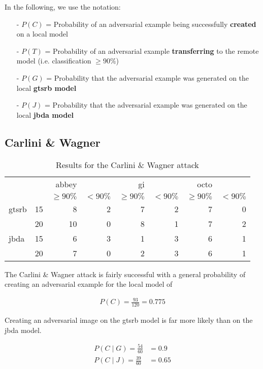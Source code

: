 In the following, we use the notation:

\begin{itemize}
\item[-] $P(C)$ = Probability of an adversarial example being successfully \textbf{created} on a local model
\item[-] $P(T)$ = Probability of an adversarial example \textbf{transferring} to the remote model (i.e. classification $\geq90\%$)
\item[-] $P(G)$ = Probability that the adversarial example was generated on the local \textbf{gtsrb model}
\item[-] $P(J)$ = Probability that the adversarial example was generated on the local \textbf{jbda model}
\end{itemize}

\subsection{Carlini \& Wagner}


\begin{table}
\begin{tabular}{l l | r r | r r | r r}
& & abbey & & gi & & octo & \\[1ex]
& & \footnotesize$\geq90\%$ & \footnotesize$<90\%$ & \footnotesize$\geq90\%$ & \footnotesize$<90\%$ & \footnotesize$\geq90\%$ & \footnotesize$<90\%$ \\[1ex]
\hline
gtsrb & 15 & 8 & 2 & 7 & 2 & 7 & 0 \\[1ex]
& 20 & 10 & 0 & 8 & 1 & 7 & 2 \\[1ex]
\hline
jbda & 15 & 6 & 3 & 1 & 3 & 6 & 1 \\[1ex]
& 20 & 7 & 0 & 2 & 3 & 6 & 1
\end{tabular}
\caption{Results for the Carlini \& Wagner attack}
\label{tab:cwl2_result}
\end{table}

The Carlini \& Wagner attack is fairly successful with a general probability of creating an adversarial example for the local model of

\begin{align*}
P(C) = \frac{93}{120} = 0.775
\end{align*}

Creating an adversarial image on the gtsrb model is far more likely than on the jbda model.

\begin{align*}
P(C \mid G) = \frac{54}{60} &= 0.9\\[1ex]
P(C \mid J) = \frac{39}{60} &= 0.65
\end{align*}

